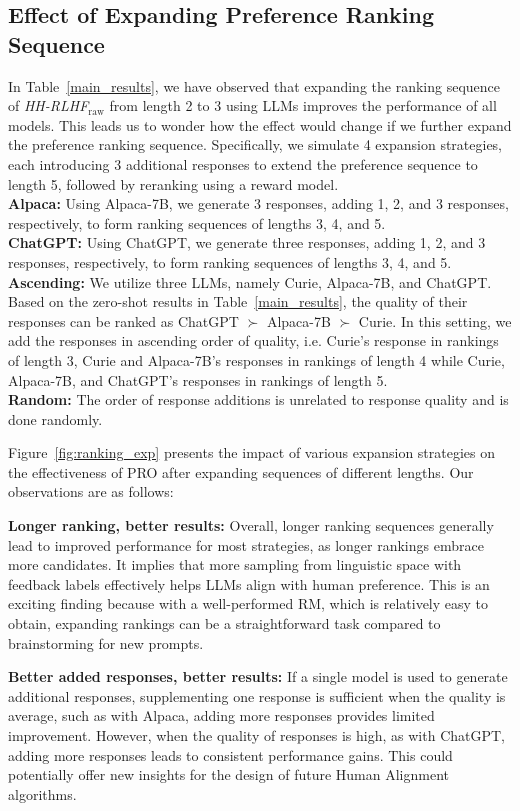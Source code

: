 \subsection{Effect of Expanding Preference Ranking Sequence} In Table~\ref{main_results}, we have observed that expanding the ranking sequence of \textit{HH-RLHF}$_{\text{raw}}$ from length 2 to 3 using LLMs improves the performance of all models. This leads us to wonder how the effect would change if we further expand the preference ranking sequence. Specifically, we simulate 4 expansion strategies, each introducing 3 additional responses to extend the preference sequence to length 5, followed by reranking using a reward model.\\
\textbf{Alpaca:} Using Alpaca-7B, we generate 3 responses, adding 1, 2, and 3 responses, respectively, to form ranking sequences of lengths 3, 4, and 5.\\
\textbf{ChatGPT:} Using ChatGPT, we generate three responses, adding 1, 2, and 3 responses, respectively, to form ranking sequences of lengths 3, 4, and 5. \\
\textbf{Ascending:} We utilize three LLMs, namely Curie, Alpaca-7B, and ChatGPT. Based on the zero-shot results in Table~\ref{main_results}, the quality of their responses can be ranked as ChatGPT $\succ$ Alpaca-7B $\succ$ Curie. In this setting, we add the responses in ascending order of quality, i.e. Curie's response in rankings of length 3, Curie and Alpaca-7B's responses in rankings of length 4 while Curie, Alpaca-7B, and ChatGPT's responses in rankings of length 5.\\
\textbf{Random:} The order of response additions is unrelated to response quality and is done randomly.

Figure~\ref{fig:ranking_exp} presents the impact of various expansion strategies on the effectiveness of PRO after expanding sequences of different lengths. Our observations are as follows:

\textbf{Longer ranking, better results:} Overall, longer ranking sequences generally lead to improved performance for most strategies, as longer rankings embrace more candidates. It implies that more sampling from linguistic space with feedback labels effectively helps LLMs align with human preference. This is an exciting finding because with a well-performed RM, which is relatively easy to obtain, expanding rankings can be a straightforward task compared to brainstorming for new prompts. 

\textbf{Better added responses, better results:} If a single model is used to generate additional responses, supplementing one response is sufficient when the quality is average, such as with Alpaca, adding more responses provides limited improvement. However, when the quality of responses is high, as with ChatGPT, adding more responses leads to consistent performance gains. This could potentially offer new insights for the design of future Human Alignment algorithms.

